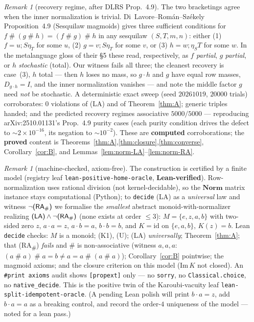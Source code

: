 \documentclass[11pt]{amsart}
\theoremstyle{plain}
\theoremstyle{definition}
\theoremstyle{remark}
\newtheorem{remark}[theorem]{Remark}
\newcommand{\Norm}{\mathbf{Norm}}
\newcommand{\Img}{\mathrm{Im}\,}
\newcommand{\id}{\mathrm{id}}
\newcommand{\comp}{\mathbin{;}}
\newcommand{\sh}{\mathbin{\#}}
\newcommand{\LA}{\textsf{(LA)}}
\newcommand{\RA}{\textsf{(RA}\textsubscript{\#}\textsf{)}}
\begin{document}
\begin{remark}[recovery regime, after DLRS Prop.\ 4.9]
\label{rem:recovery}
The two bracketings agree when the inner normalization is trivial. Di~Lavore--Rom\'an--Sz\'ekely
Proposition~4.9 (Sesquilaw magmoids) gives three sufficient conditions for
$f\sh(g\sh h)=(f\sh g)\sh h$ in any sesquilaw $(S,T,m,n)$: either (1) $f=u\comp S\eta_T$ for some
$u$, (2) $g=v\comp S\eta_T$ for some $v$, or (3) $h=w\comp\eta_S T$ for some $w$. In the metalanguage
gloss of their \S5 these read, respectively, as $f$ \emph{partial}, $g$ \emph{partial}, or $h$
\emph{stochastic} (total). Our witness fails all three; the cleanest recovery is case~(3), $h$ total
--- then $h$ loses no mass, so $g\cdot h$ and $g$ have equal row masses, $D_{g\cdot h}=I$, and the
inner normalization vanishes --- and note the middle factor $g$ need \emph{not} be stochastic. A deterministic exact sweep (seed $20261019$, $20000$ trials) corroborates:
$0$ violations of \LA{} and of Theorem~\ref{thm:A}; generic triples handed; and the predicted
recovery regimes associative $5000/5000$ --- reproducing arXiv:2510.01131's Prop.~4.9 purity cases
(each purity condition drives the defect to $\sim 2\times10^{-16}$, its negation to $\sim10^{-2}$).
These are \textbf{computed} corroborations; the \textbf{proved} content is
Theorems~\ref{thm:A},\ref{thm:closure},\ref{thm:converse}, Corollary~\ref{cor:B}, and
Lemmas~\ref{lem:norm-LA}--\ref{lem:norm-RA}.
\end{remark}

\begin{remark}[machine-checked, axiom-free]
\label{rem:lean}
The construction is certified by a finite model (registry leaf \texttt{lean-positive-home-oracle},
\textbf{Lean-verified}). Row-normalization uses rational division (not kernel-decidable), so the
$\Norm$ matrix instance stays computational (Python); to \texttt{decide} \LA{} as a \emph{universal}
law and witness $\neg\RA{}$ we formalise the \emph{smallest} abstract monoid-with-normalizer
realizing $\LA\wedge\neg\RA$ (none exists at order $\le 3$): $M=\{e,z,a,b\}$ with two-sided zero $z$,
$a\cdot a=z$, $a\cdot b=a$, $b\cdot b=b$, and $K=\id$ on $\{e,a,b\}$, $K(z)=b$. Lean \texttt{decide}
checks: $M$ is a monoid; \textsf{(K1)}, \textsf{(U)}; \LA{} \emph{universally}; Theorem~\ref{thm:A};
that \RA{} \emph{fails} and $\sh$ is non-associative (witness $a,a,a$:
$(a\sh a)\sh a=b\ne a=a\sh(a\sh a)$); Corollary~\ref{cor:B} pointwise; the magmoid axioms; and the
closure criterion on this model ($\Img K$ not closed). An \texttt{\#print axioms} audit shows
\texttt{[propext]} only --- no \texttt{sorry}, no \texttt{Classical.choice}, no
\texttt{native\_decide}. This is the positive twin of the Karoubi-vacuity leaf
\texttt{lean-split-idempotent-oracle}. (A pending Lean polish will print $b\cdot a=z$, add $b\cdot
a=a$ as a breaking control, and record the order-$4$ uniqueness of the model --- noted for a lean
pass.)
\end{remark}
\end{document}
